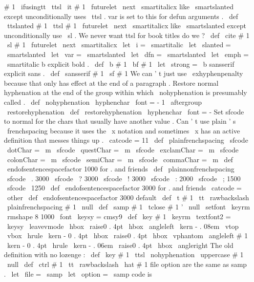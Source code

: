 #
1
{
{
\
ifusingtt
\
ttsl
\
it
#
1
}
\
futurelet
\
next
\
smartitalicx
}
%
like
\
smartslanted
except
unconditionally
uses
\
ttsl
.
%
var
is
set
to
this
for
defun
arguments
.
\
def
\
ttslanted
#
1
{
{
\
ttsl
#
1
}
\
futurelet
\
next
\
smartitalicx
}
%
like
\
smartslanted
except
unconditionally
use
\
sl
.
We
never
want
%
ttsl
for
book
titles
do
we
?
\
def
\
cite
#
1
{
{
\
sl
#
1
}
\
futurelet
\
next
\
smartitalicx
}
\
let
\
i
=
\
smartitalic
\
let
\
slanted
=
\
smartslanted
\
let
\
var
=
\
smartslanted
\
let
\
dfn
=
\
smartslanted
\
let
\
emph
=
\
smartitalic
%
b
explicit
bold
.
\
def
\
b
#
1
{
{
\
bf
#
1
}
}
\
let
\
strong
=
\
b
%
sansserif
explicit
sans
.
\
def
\
sansserif
#
1
{
{
\
sf
#
1
}
}
%
We
can
'
t
just
use
\
exhyphenpenalty
because
that
only
has
effect
at
%
the
end
of
a
paragraph
.
Restore
normal
hyphenation
at
the
end
of
the
%
group
within
which
\
nohyphenation
is
presumably
called
.
%
\
def
\
nohyphenation
{
\
hyphenchar
\
font
=
-
1
\
aftergroup
\
restorehyphenation
}
\
def
\
restorehyphenation
{
\
hyphenchar
\
font
=
-
}
%
Set
sfcode
to
normal
for
the
chars
that
usually
have
another
value
.
%
Can
'
t
use
plain
'
s
\
frenchspacing
because
it
uses
the
\
x
notation
and
%
sometimes
\
x
has
an
active
definition
that
messes
things
up
.
%
\
catcode
=
11
\
def
\
plainfrenchspacing
{
%
\
sfcode
\
dotChar
=
\
m
\
sfcode
\
questChar
=
\
m
\
sfcode
\
exclamChar
=
\
m
\
sfcode
\
colonChar
=
\
m
\
sfcode
\
semiChar
=
\
m
\
sfcode
\
commaChar
=
\
m
\
def
\
endofsentencespacefactor
{
1000
}
%
for
.
and
friends
}
\
def
\
plainnonfrenchspacing
{
%
\
sfcode
\
.
3000
\
sfcode
\
?
3000
\
sfcode
\
!
3000
\
sfcode
\
:
2000
\
sfcode
\
;
1500
\
sfcode
\
1250
\
def
\
endofsentencespacefactor
{
3000
}
%
for
.
and
friends
}
\
catcode
=
\
other
\
def
\
endofsentencespacefactor
{
3000
}
%
default
\
def
\
t
#
1
{
%
{
\
tt
\
rawbackslash
\
plainfrenchspacing
#
1
}
%
\
null
}
\
def
\
samp
#
1
{
\
tclose
{
#
1
}
'
\
null
}
\
setfont
\
keyrm
\
rmshape
{
8
}
{
1000
}
\
font
\
keysy
=
cmsy9
\
def
\
key
#
1
{
{
\
keyrm
\
textfont2
=
\
keysy
\
leavevmode
\
hbox
{
%
\
raise0
.
4pt
\
hbox
{
\
angleleft
}
\
kern
-
.
08em
\
vtop
{
%
\
vbox
{
\
hrule
\
kern
-
0
.
4pt
\
hbox
{
\
raise0
.
4pt
\
hbox
{
\
vphantom
{
\
angleleft
}
}
#
1
}
}
%
\
kern
-
0
.
4pt
\
hrule
}
%
\
kern
-
.
06em
\
raise0
.
4pt
\
hbox
{
\
angleright
}
}
}
}
%
The
old
definition
with
no
lozenge
:
%
\
def
\
key
#
1
{
{
\
ttsl
\
nohyphenation
\
uppercase
{
#
1
}
}
\
null
}
\
def
\
ctrl
#
1
{
{
\
tt
\
rawbackslash
\
hat
}
#
1
}
%
file
option
are
the
same
as
samp
.
\
let
\
file
=
\
samp
\
let
\
option
=
\
samp
%
code
is
